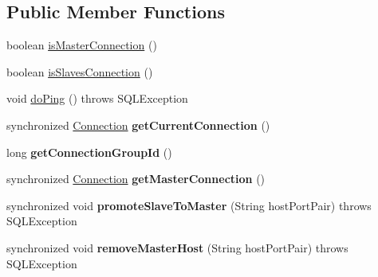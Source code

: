 \subsection*{Public Member Functions}
\begin{DoxyCompactItemize}
\item 
boolean \mbox{\hyperlink{classcom_1_1mysql_1_1jdbc_1_1_replication_connection_proxy_ab25d7e5a9f2b59a77d9ec427dde0b7df}{is\+Master\+Connection}} ()
\item 
boolean \mbox{\hyperlink{classcom_1_1mysql_1_1jdbc_1_1_replication_connection_proxy_a79f83682c33e022f47c7392a5dd242af}{is\+Slaves\+Connection}} ()
\item 
void \mbox{\hyperlink{classcom_1_1mysql_1_1jdbc_1_1_replication_connection_proxy_a44cea9c5b2aef7a32ea73568ab157eeb}{do\+Ping}} ()  throws S\+Q\+L\+Exception 
\item 
\mbox{\label{classcom_1_1mysql_1_1jdbc_1_1_replication_connection_proxy_a8fa5c5fc025c8fd93c82bd85232fef00}} 
synchronized \mbox{\hyperlink{interfacecom_1_1mysql_1_1jdbc_1_1_connection}{Connection}} {\bfseries get\+Current\+Connection} ()
\item 
\mbox{\label{classcom_1_1mysql_1_1jdbc_1_1_replication_connection_proxy_ae9ad1e963ad4f46c814b3f6ff80442af}} 
long {\bfseries get\+Connection\+Group\+Id} ()
\item 
\mbox{\label{classcom_1_1mysql_1_1jdbc_1_1_replication_connection_proxy_a99a675ae08646b9e0f9022b6e3693f92}} 
synchronized \mbox{\hyperlink{interfacecom_1_1mysql_1_1jdbc_1_1_connection}{Connection}} {\bfseries get\+Master\+Connection} ()
\item 
\mbox{\label{classcom_1_1mysql_1_1jdbc_1_1_replication_connection_proxy_a86a1eead8f2211331d648231e3c2de73}} 
synchronized void {\bfseries promote\+Slave\+To\+Master} (String host\+Port\+Pair)  throws S\+Q\+L\+Exception 
\item 
\mbox{\label{classcom_1_1mysql_1_1jdbc_1_1_replication_connection_proxy_a5d58f64b838c645e72685108b7eb7545}} 
synchronized void {\bfseries remove\+Master\+Host} (String host\+Port\+Pair)  throws S\+Q\+L\+Exception 

\end{DoxyCompactItemize}
